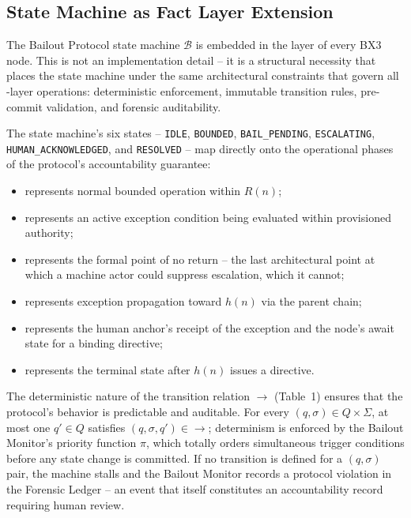 \subsection{State Machine as Fact Layer Extension}\label{sec:bailout-state-machine-as-fact}

The Bailout Protocol state machine $\mathcal{B}$ is embedded in the \fact{}
layer of every BX3 node.  This is not an implementation detail -- it is a
structural necessity that places the state machine under the same architectural
constraints that govern all \fact-layer operations: deterministic enforcement,
immutable transition rules, pre-commit validation, and forensic auditability.

The state machine's six states -- \texttt{IDLE}, \texttt{BOUNDED},
\texttt{BAIL\_PENDING}, \texttt{ESCALATING}, \texttt{HUMAN\_ACKNOWLEDGED},
and \texttt{RESOLVED} -- map directly onto the operational phases of the
protocol's accountability guarantee:

\begin{itemize}\itemsep=0pt
\item[\texttt{IDLE}] represents normal bounded operation within $R(n)$;
\item[\texttt{BOUNDED}] represents an active exception condition being
evaluated within provisioned authority;
\item[\texttt{BAIL\_PENDING}] represents the formal point of no return --
the last architectural point at which a machine actor could suppress
escalation, which it cannot;
\item[\texttt{ESCALATING}] represents exception propagation toward $h(n)$
via the parent chain;
\item[\texttt{HUMAN\_ACKNOWLEDGED}] represents the human anchor's receipt
of the exception and the node's await state for a binding directive;
\item[\texttt{RESOLVED}] represents the terminal state after $h(n)$ issues
a directive.
\end{itemize}

The deterministic nature of the transition relation $\rightarrow$ (Table~1)
ensures that the protocol's behavior is predictable and auditable.  For every
$(q, \sigma) \in Q \times \Sigma$, at most one $q' \in Q$ satisfies
$(q, \sigma, q') \in \rightarrow$; determinism is enforced by the Bailout
Monitor's priority function $\pi$, which totally orders simultaneous trigger
conditions before any state change is committed.  If no transition is defined
for a $(q, \sigma)$ pair, the machine stalls and the Bailout Monitor records a
protocol violation in the Forensic Ledger -- an event that itself constitutes
an accountability record requiring human review.


